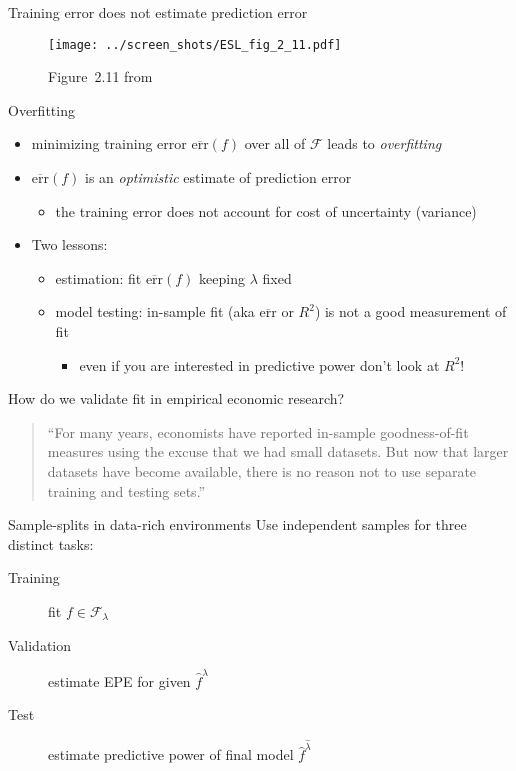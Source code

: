 \documentclass[xcolor=dvipsnames, handout]{beamer}
\begin{document}
\begin{frame}{Training error does not estimate prediction error}
\begin{figure}
  \texttt{[image: ../screen\_shots/ESL\_fig\_2\_11.pdf]}
   \caption{Figure~2.11 from \textcite{hastie2009elements}}
\end{figure}
\end{frame}


\begin{frame}{Overfitting}
\begin{itemize}
  \item minimizing training error $\overline{\text{err}} (f)$ over all of $\mathcal{F}$ leads to \emph{overfitting}
  \item $\overline{\text{err}} (f)$ is an \emph{optimistic} estimate of prediction error
  \begin{itemize}
    \item the training error does not account for cost of uncertainty (variance)
  \end{itemize}
\pause
  \item Two lessons: 
  \begin{itemize}
    \item estimation: fit $\overline{\text{err}} (f)$ keeping $\lambda$ fixed
    \item model testing: in-sample fit (aka $\overline{\text{err}}$ or $R^2$) is not a good measurement of fit
    \begin{itemize}
      \item even if you are interested in predictive power don't look at $R^2$!
    \end{itemize}
  \end{itemize}
\end{itemize}
\end{frame}


\begin{frame}{How do we validate fit in empirical economic research?}
\begin{quote}
``For many years, economists have reported in-sample goodness-of-fit measures using the excuse that we had small datasets. But now that larger datasets have become available, there is no reason not to use separate training and testing sets.'' \parencite{varian2014big}
\end{quote}
\end{frame}


\begin{frame}{Sample-splits in data-rich environments}
Use independent samples for three distinct tasks: 
\begin{description}
\item[Training] fit $f \in \mathcal{F}_{\lambda}$
\item[Validation] estimate EPE for given $\hat{f}^{\lambda}$
\item[Test] estimate predictive power of final model $\hat{f}^{\hat{\lambda}}$
\end{description}
\end{frame}
\end{document}
